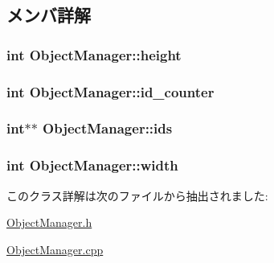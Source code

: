 \subsection{メンバ詳解}
\hypertarget{class_object_manager_a83650f15c75a9f0f0415966e15b2ad4f}{
\subsubsection[{height}]{\setlength{\rightskip}{0pt plus 5cm}int Object\+Manager\+::height\hspace{0.3cm}{\ttfamily [private]}}}\label{class_object_manager_a83650f15c75a9f0f0415966e15b2ad4f}
\hypertarget{class_object_manager_a164a320ca3c3de4530536827d99a6458}{
\subsubsection[{id\+\_\+counter}]{\setlength{\rightskip}{0pt plus 5cm}int Object\+Manager\+::id\+\_\+counter\hspace{0.3cm}{\ttfamily [private]}}}\label{class_object_manager_a164a320ca3c3de4530536827d99a6458}
\hypertarget{class_object_manager_ae96857805143e168769f972f9b16bd09}{
\subsubsection[{ids}]{\setlength{\rightskip}{0pt plus 5cm}int$\ast$$\ast$ Object\+Manager\+::ids\hspace{0.3cm}{\ttfamily [private]}}}\label{class_object_manager_ae96857805143e168769f972f9b16bd09}
\hypertarget{class_object_manager_ae832dadf8bc59ae778c14c38065707aa}{
\subsubsection[{width}]{\setlength{\rightskip}{0pt plus 5cm}int Object\+Manager\+::width\hspace{0.3cm}{\ttfamily [private]}}}\label{class_object_manager_ae832dadf8bc59ae778c14c38065707aa}


このクラス詳解は次のファイルから抽出されました\+:\begin{DoxyCompactItemize}
\item 
\hyperlink{_object_manager_8h}{Object\+Manager.\+h}\item 
\hyperlink{_object_manager_8cpp}{Object\+Manager.\+cpp}\end{DoxyCompactItemize}
